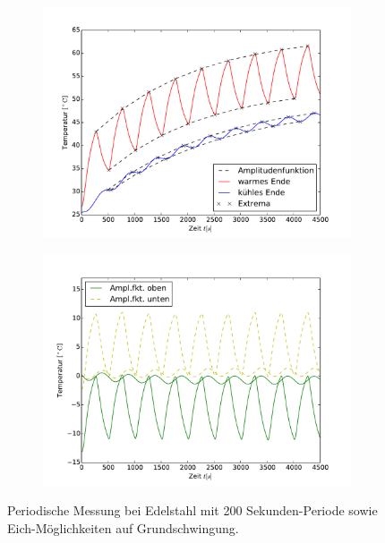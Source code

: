 \begin{figure}[h!]
	\centering
	\begin{subfigure}{0.9\textwidth}
	\centering
	\includegraphics[width=\textwidth]{Bilder/M3_Edelstahl.pdf}
	\end{subfigure}
	\begin{subfigure}{0.9\textwidth}
	\centering
	\includegraphics[width=\textwidth]{Bilder/Normierungsauswahl/M3_Edelstahl_norm.pdf}
	\end{subfigure}
	\caption{Periodische Messung bei Edelstahl mit 200 Sekunden-Periode sowie Eich-Möglichkeiten auf Grundschwingung.}
	\label{fig:M3Edelstahl}
\end{figure}
